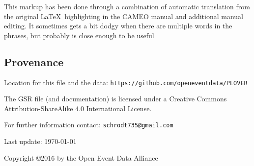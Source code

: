 \documentclass[11pt, oneside]{article}   	%
\begin{document}
This markup has been done through a combination of automatic translation from the original \LaTeX ~highlighting in the CAMEO manual
and additional manual editing. It sometimes gets a bit dodgy when there are multiple words in the phrases, but probably is close enough to be useful

\subsection*{Provenance}

Location for this file and the data: \texttt{https://github.com/openeventdata/PLOVER}

The GSR file (and documentation) is licensed under a Creative Commons Attribution-ShareAlike 4.0 International License.

For further information contact: \texttt{schrodt735@gmail.com}

Last update: \today

Copyright \copyright 2016 by the Open Event Data Alliance
\end{document}
